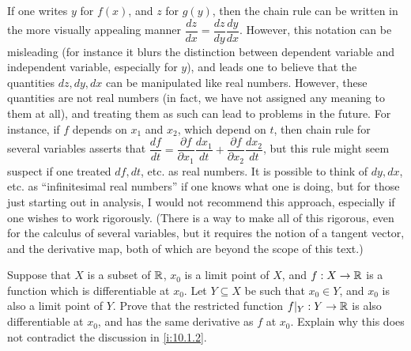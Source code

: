 \setcounter{thm}{16}
\begin{rmk}\label{i:10.1.17}
  If one writes \(y\) for \(f(x)\), and \(z\) for \(g(y)\), then the chain rule can be written in the more visually appealing manner \(\dfrac{dz}{dx} = \dfrac{dz}{dy} \dfrac{dy}{dx}\).
  However, this notation can be misleading (for instance it blurs the distinction between dependent variable and independent variable, especially for \(y\)), and leads one to believe that the quantities \(dz, dy, dx\) can be manipulated like real numbers.
  However, these quantities are not real numbers (in fact, we have not assigned any meaning to them at all), and treating them as such can lead to problems in the future.
  For instance, if \(f\) depends on \(x_1\) and \(x_2\), which depend on \(t\), then chain rule for several variables asserts that \(\dfrac{df}{dt} = \dfrac{\partial f}{\partial x_1} \dfrac{dx_1}{dt} + \dfrac{\partial f}{\partial x_2} \dfrac{dx_2}{dt}\), but this rule might seem suspect if one treated \(df, dt\), etc. as real numbers.
  It is possible to think of \(dy, dx\), etc. as ``infinitesimal real numbers'' if one knows what one is doing, but for those just starting out in analysis, I would not recommend this approach, especially if one wishes to work rigorously.
  (There is a way to make all of this rigorous, even for the calculus of several variables, but it requires the notion of a tangent vector, and the derivative map, both of which are beyond the scope of this text.)
\end{rmk}

\exercisesection

\begin{ex}\label{i:ex:10.1.1}
  Suppose that \(X\) is a subset of \(\mathbb{R}\), \(x_0\) is a limit point of \(X\), and \(f : X \to \mathbb{R}\) is a function which is differentiable at \(x_0\).
  Let \(Y \subseteq X\) be such that \(x_0 \in Y\), and \(x_0\) is also a limit point of \(Y\).
  Prove that the restricted function \(f|_Y : Y \to \mathbb{R}\) is also differentiable at \(x_0\), and has the same derivative as \(f\) at \(x_0\).
  Explain why this does not contradict the discussion in \cref{i:10.1.2}.
\end{ex}

